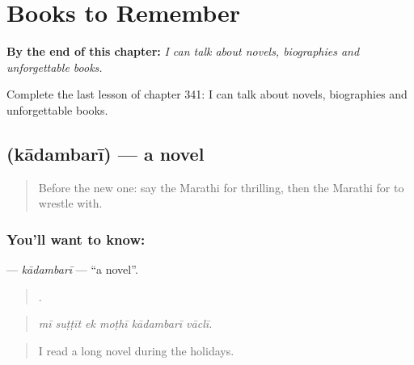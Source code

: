
\chapter{Books to Remember}
\label{ch:mr-books-to-remember}

\begin{chapteropening}
\textbf{By the end of this chapter:} \emph{I can talk about novels, biographies and unforgettable books.}

Complete the last lesson of chapter 341: I can talk about novels, biographies and unforgettable books.
\end{chapteropening}

\section[\texorpdfstring{\mr{कादंबरी} (kādambarī)}{कादंबरी (kādambarī)}]{ (kādambarī) — a novel}

\label{lesson:MR-C341-kadambari}



\begin{quote}
Before the new one: say the Marathi for thrilling, then the Marathi for to wrestle with.
\end{quote}

\subsection*{You'll want to know: }
\textbf{} — \emph{kādambarī} — \textquotedblleft{}a novel\textquotedblright{}.

\begin{quote}
     .
\end{quote}

\begin{quote}
\emph{mī suṭṭīt ek moṭhī kādambarī vāclī.}
\end{quote}

\begin{quote}
I read a long novel during the holidays.
\end{quote}

